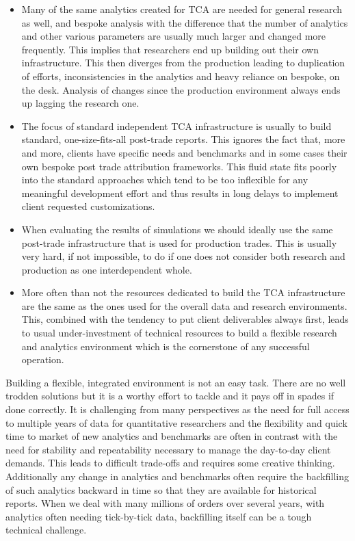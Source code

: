 \begin{itemize}
\item Many of the same analytics created for TCA are needed for general research as well, and bespoke analysis with the difference that the number of analytics and other various parameters are usually much larger and changed more frequently. This implies that researchers end up building out their own infrastructure. This then diverges from the production leading to duplication of efforts, inconsistencies in the analytics and heavy reliance on bespoke, on the desk. Analysis of changes since the production environment always ends up lagging the research one.

\item The focus of standard independent TCA infrastructure is usually to build standard, one-size-fits-all post-trade reports. This ignores the fact that, more and more, clients have specific needs and benchmarks and in some cases their own bespoke post trade attribution frameworks. This fluid state fits poorly into the standard approaches which tend to be too inflexible for any meaningful development effort and thus results in long delays to implement client requested customizations.

\item When evaluating the results of simulations we should ideally use the same post-trade infrastructure that is used for production trades. This is usually very hard, if not impossible, to do if one does not consider both research and production as one interdependent whole.

\item More often than not the resources dedicated to build the TCA infrastructure are the same as the ones used for the overall data and research environments. This, combined with the tendency to put client deliverables always first, leads to usual under-investment of technical resources to build a flexible research and analytics environment which is the cornerstone of any successful operation.
\end{itemize}


Building a flexible, integrated environment is not an easy task. There are no well trodden solutions but it is a worthy effort to tackle and it pays off in spades if done correctly. It is challenging from many perspectives as the need for full access to multiple years of data  for quantitative researchers and the flexibility and quick time to market of new analytics and benchmarks are often in contrast with the need for stability and repeatability necessary to manage the day-to-day client demands. This leads to difficult trade-offs and requires some creative thinking. Additionally any change in analytics and benchmarks often require the backfilling of such analytics backward in time so that they are available for historical reports. When we deal with many millions of orders over several years, with analytics often needing tick-by-tick data, backfilling itself can be a tough technical challenge.


